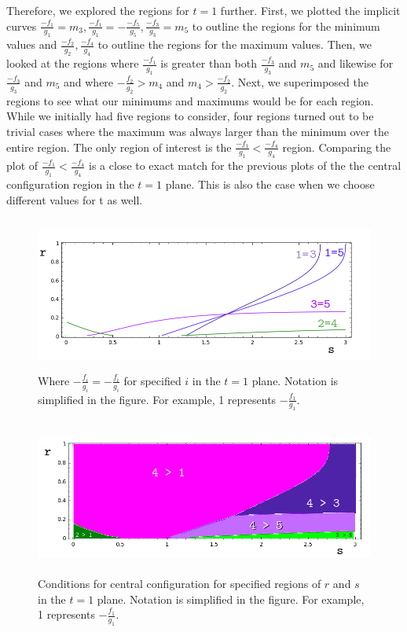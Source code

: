 \documentclass[11pt,leqno]{article}
\theoremstyle{definition}
\theoremstyle{remark}
\numberwithin{equation}{section}
\begin{document}
Therefore, we explored the regions for $t = 1$ further. First, we plotted the implicit curves $\frac{-f_1}{g_1}=m_3,\frac{-f_1}{g_1}=-\frac{-f_5}{g_5},\frac{-f_3}{g_3}=m_5$ to outline the regions for the minimum values and $\frac{-f_2}{g_2},\frac{-f_4}{g_4}$ to outline the regions for the maximum values. Then, we looked at the regions where $\frac{-f_1}{g_1}$ is greater than both $\frac{-f_3}{g_3}$ and $m_5$ and likewise for $\frac{-f_3}{g_3}$ and $m_5$ and where $-\frac{f_2}{g_2}>m_4$ and $m_4>\frac{-f_2}{g_2}$. Next, we superimposed the regions to see what our minimums and maximums would be for each region. While we initially had five regions to consider, four regions turned out to be trivial cases where the maximum was always larger than the minimum over the entire region. The only region of interest is the $\frac{-f_1}{g_1} < \frac{-f_4}{g_4}$ region. Comparing the plot of $\frac{-f_1}{g_1} < \frac{-f_4}{g_4}$ is a close to exact match for the previous plots of the the central configuration region in the $t=1$ plane. This is also the case when we choose different values for t as well.



\begin{center}

\begin{figure}
\includegraphics[width=6in, height=2in]{t1regionOutline.png}
 \caption{ \label{EL}  Where $-\frac{f_i}{g_i}=-\frac{f_i}{g_i}$ for specified $i$ in the $t=1$ plane. Notation is simplified in the figure. For example, 1 represents $-\frac{f_1}{g_1}$.} 
\end{figure}

\begin{figure}
\includegraphics[width=6in, height=2in]{t1rG0region.png}
 \caption{ \label{EL}  Conditions for central configuration for specified regions of $r$ and $s$ in the $t=1$ plane. Notation is simplified in the figure. For example, 1 represents $-\frac{f_1}{g_1}$.}
\end{figure}

\end{center}
\end{document}
